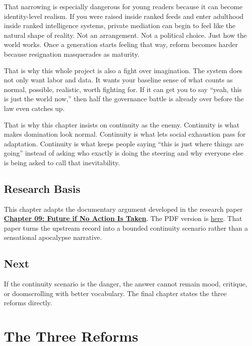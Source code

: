 \documentclass[
  american,
  12pt,
  letterpaper,
]{article}
\begin{document}
That narrowing is especially dangerous for young readers because it can
become identity-level realism. If you were raised inside ranked feeds
and enter adulthood inside ranked intelligence systems, private
mediation can begin to feel like the natural shape of reality. Not an
arrangement. Not a political choice. Just how the world works. Once a
generation starts feeling that way, reform becomes harder because
resignation masquerades as maturity.

That is why this whole project is also a fight over imagination. The
system does not only want labor and data. It wants your baseline sense
of what counts as normal, possible, realistic, worth fighting for. If it
can get you to say ``yeah, this is just the world now,'' then half the
governance battle is already over before the law even catches up.

That is why this chapter insists on continuity as the enemy. Continuity
is what makes domination look normal. Continuity is what lets social
exhaustion pass for adaptation. Continuity is what keeps people saying
``this is just where things are going'' instead of asking who exactly is
doing the steering and why everyone else is being asked to call that
inevitability.

\subsection{Research Basis}\label{research-basis-9}

This chapter adapts the documentary argument developed in the research
paper
\href{../../papers/html/09_future-if-unchecked_paper.html}{\textbf{Chapter
09: Future if No Action Is Taken}}. The PDF version is
\href{../../papers/pdf/09_future-if-unchecked_paper/09_future-if-unchecked_paper.pdf}{here}.
That paper turns the upstream record into a bounded continuity scenario
rather than a sensational apocalypse narrative.

\subsection{Next}\label{next-9}

If the continuity scenario is the danger, the answer cannot remain mood,
critique, or doomscrolling with better vocabulary. The final chapter
states the three reforms directly.

\section{The Three Reforms}\label{the-three-reforms}
\end{document}
